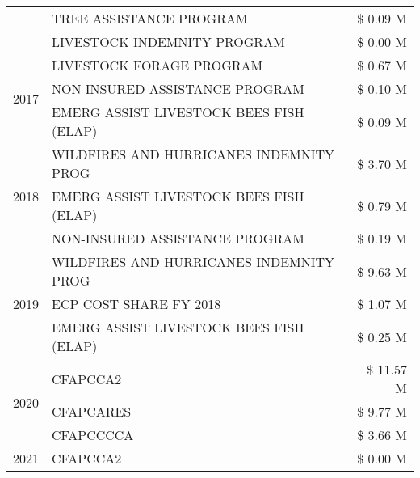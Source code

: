 \begin{tabular}{llr}
 & TREE ASSISTANCE PROGRAM                       & \$ 0.09 M \\
 & LIVESTOCK INDEMNITY PROGRAM                   & \$ 0.00 M \\
\cline{1-3}
\multirow[t]{3}{*}{2017} & LIVESTOCK FORAGE PROGRAM & \$ 0.67 M \\
 & NON-INSURED ASSISTANCE PROGRAM & \$ 0.10 M \\
 & EMERG ASSIST LIVESTOCK BEES FISH (ELAP) & \$ 0.09 M \\
\cline{1-3}
\multirow[t]{3}{*}{2018} & WILDFIRES AND HURRICANES INDEMNITY PROG & \$ 3.70 M \\
 & EMERG ASSIST LIVESTOCK BEES FISH (ELAP) & \$ 0.79 M \\
 & NON-INSURED ASSISTANCE PROGRAM & \$ 0.19 M \\
\cline{1-3}
\multirow[t]{3}{*}{2019} & WILDFIRES AND HURRICANES INDEMNITY PROG & \$ 9.63 M \\
 & ECP COST SHARE FY 2018 & \$ 1.07 M \\
 & EMERG ASSIST LIVESTOCK BEES FISH (ELAP) & \$ 0.25 M \\
\cline{1-3}
\multirow[t]{3}{*}{2020} & CFAPCCA2 & \$ 11.57 M \\
 & CFAPCARES & \$ 9.77 M \\
 & CFAPCCCCA & \$ 3.66 M \\
\cline{1-3}
2021 & CFAPCCA2 & \$ 0.00 M \\
\cline{1-3}
\bottomrule
\end{tabular}
